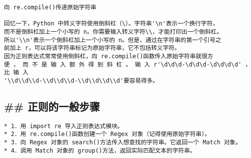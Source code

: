 \documentclass[11pt]{article}
\begin{document}
\begin{verbatim}
向 re.compile()传递原始字符串

回忆一下，Python 中转义字符使用倒斜杠（\）。字符串'\n'表示一个换行字符，
而不是倒斜杠加上一个小写的 n。你需要输入转义字符\\，才能打印出一个倒斜杠。
所以'\\n'表示一个倒斜杠加上一个小写的 n。但是，通过在字符串的第一个引号之
前加上 r，可以将该字符串标记为原始字符串，它不包括转义字符。
因为正则表达式常常使用倒斜杠，向 re.compile()函数传入原始字符串就很方
便 ， 而 不 是 输 入 额 外 得 到 斜 杠 。 输 入 r'\d\d\d-\d\d\d-\d\d\d\d' ， 比 输 入
'\\d\\d\\d-\\d\\d\\d-\\d\\d\\d\\d'要容易得多。
\end{verbatim}

\subsection{\#\#
正则的一般步骤}\label{ux6b63ux5219ux7684ux4e00ux822cux6b65ux9aa4}

\begin{verbatim}
* 1．用 import re 导入正则表达式模块。
* 2．用 re.compile()函数创建一个 Regex 对象（记得使用原始字符串）。
* 3．向 Regex 对象的 search()方法传入想查找的字符串。它返回一个 Match 对象。
* 4．调用 Match 对象的 group()方法，返回实际匹配文本的字符串。
\end{verbatim}
\end{document}
